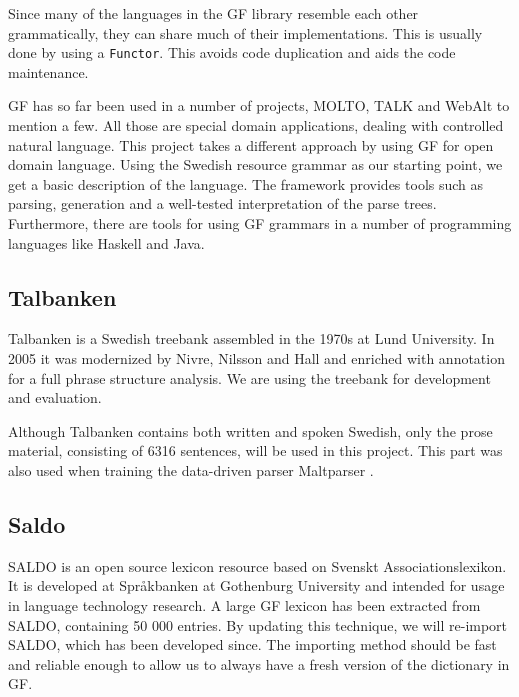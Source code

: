 \documentclass[submission]{eptcs} %
\begin{document}
Since many of the languages in the GF library resemble each other grammatically,
they can share much of their implementations. This is usually done by using a
\verb|Functor|. %
This avoids code duplication and aids the code maintenance.

GF has so far been used in a number of projects, MOLTO\cite{molto}, TALK\cite{talk}
and WebAlt\cite{webalt} to mention a few. 
All those are special domain applications, dealing with controlled natural
language.
This project takes a different approach by using GF for open domain language.
Using the Swedish resource grammar as our starting
point, %
we get a basic description of the language. The framework provides
tools such as parsing, generation and
a well-tested interpretation of the parse trees. Furthermore, there are tools
for using GF grammars in a number of programming languages like Haskell
and Java. 



\subsection{Talbanken}
Talbanken\cite{talbanken} is
a Swedish treebank assembled in the 1970s at Lund University.
In 2005 it was modernized by Nivre, Nilsson and Hall\cite{talbanken05} and
enriched with annotation for a full phrase structure analysis. 
We are using the treebank for development and evaluation. 

Although Talbanken contains both written and spoken Swedish,
only the prose material, consisting of 6316 sentences, will be used in this project.
This part was also used when training the data-driven parser Maltparser \cite{malt}. \\

\subsection{Saldo}
SALDO\cite{saldo} is an open source lexicon resource
based on Svenskt Associationslexikon. It is
developed at Språkbanken at Gothenburg University
and intended for usage in language technology
research. 
A large GF lexicon has been extracted from SALDO,
containing 50 000 entries. By updating this technique, we will
re-import SALDO, which has been developed since.
The importing method should be fast and reliable
enough to allow us to always have a fresh version of the dictionary
in GF.
\end{document}
